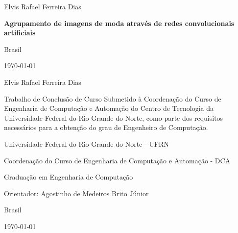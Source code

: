 \documentclass[12pt]{report}
\def\worktitle{Agrupamento de imagens de moda através de redes convolucionais artificiais}
\def\workauthor{Elvis Rafael Ferreira Dias}
\begin{document}
\begin{titlepage}

	\centering
	{\normalsize \workauthor \par}
	\vfill
	{\Large\bfseries \worktitle \par}
	\vfill


	{\normalsize Brasil\par}
	{\normalsize \monthyeardate\today}
\end{titlepage}

\begin{titlepage}

	\centering
	{\normalsize \workauthor\par}
	\vfill
	\centering
	{\Large\bfseries \par}
	\vfill

	\begin{flushright}	
	\begin{minipage}{15em}	
  	Trabalho de Conclusão de Curso Submetido à Coordenação do Curso de Engenharia de Computação e Automação do Centro de Tecnologia da Universidade Federal do Rio Grande do Norte, como parte dos requisitos necessários para a obtenção do grau de Engenheiro de Computação.
	\end{minipage}
	\end{flushright}	
	\vfill
	
	
	{\small Universidade Federal do Rio Grande do Norte - UFRN \par}
	{\small Coordenação do Curso de Engenharia de Computação e Automação - DCA \par}
	{\small Graduação em Engenharia de Computação \par}
	\vfill
	\normalsize
	\centering
	{\normalsize Orientador: Agostinho de Medeiros Brito Júnior \par}
	\vfill
	{\normalsize Brasil\par}
	{\normalsize \monthyeardate\today}
\end{titlepage}
\end{document}
